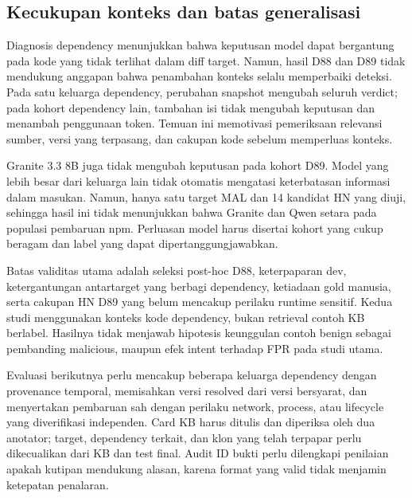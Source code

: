 \subsection{Kecukupan konteks dan batas generalisasi}

Diagnosis dependency menunjukkan bahwa keputusan model dapat bergantung
pada kode yang tidak terlihat dalam diff target. Namun, hasil D88 dan D89
tidak mendukung anggapan bahwa penambahan konteks selalu memperbaiki deteksi.
Pada satu keluarga dependency, perubahan snapshot mengubah seluruh verdict;
pada kohort dependency lain, tambahan isi tidak mengubah keputusan dan
menambah penggunaan token. Temuan ini memotivasi pemeriksaan relevansi sumber,
versi yang terpasang, dan cakupan kode sebelum memperluas konteks.

Granite 3.3 8B juga tidak mengubah keputusan pada kohort D89. Model yang
lebih besar dari keluarga lain tidak otomatis mengatasi keterbatasan
informasi dalam masukan. Namun, hanya satu target MAL dan 14 kandidat HN
yang diuji, sehingga hasil ini tidak menunjukkan bahwa Granite dan Qwen
setara pada populasi pembaruan npm. Perluasan model harus disertai kohort
yang cukup beragam dan label yang dapat dipertanggungjawabkan.

Batas validitas utama adalah seleksi post-hoc D88, keterpaparan dev,
ketergantungan antartarget yang berbagi dependency, ketiadaan gold manusia,
serta cakupan HN D89 yang belum mencakup perilaku runtime sensitif.
Kedua studi menggunakan konteks kode dependency, bukan retrieval contoh KB
berlabel. Hasilnya tidak menjawab hipotesis keunggulan contoh benign sebagai
pembanding malicious, maupun efek intent terhadap FPR pada studi utama.

Evaluasi berikutnya perlu mencakup beberapa keluarga dependency dengan
provenance temporal, memisahkan versi resolved dari versi bersyarat, dan
menyertakan pembaruan sah dengan perilaku network, process, atau lifecycle
yang diverifikasi independen. Card KB harus ditulis dan diperiksa oleh dua
anotator; target, dependency terkait, dan klon yang telah terpapar perlu
dikecualikan dari KB dan test final. Audit ID bukti perlu dilengkapi penilaian
apakah kutipan mendukung alasan, karena format yang valid tidak menjamin
ketepatan penalaran.

